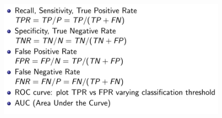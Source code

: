 \begin{figure}[H]
    \centering
    \includegraphics[width=12cm,keepaspectratio]{images/Classification Evaluation/Screenshot_20221004_135110.png}
    \caption{}
    \label{fig:image_metric_2}
\end{figure}